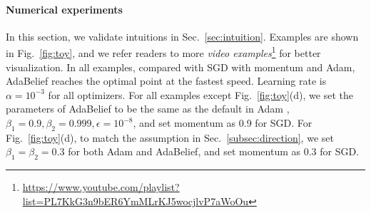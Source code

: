 \documentclass{article}
\begin{document}
\paragraph{Numerical experiments}
In this section, we validate intuitions in Sec.~\ref{sec:intuition}. Examples are shown in Fig.~\ref{fig:toy}, and we refer readers to more \textit{video examples}\footnote{\url{https://www.youtube.com/playlist?list=PL7KkG3n9bER6YmMLrKJ5wocjlvP7aWoOu}} for better visualization. In all examples, compared with SGD with momentum and Adam, AdaBelief reaches the optimal point at the fastest speed. Learning rate is $\alpha=10^{-3}$ for all optimizers. For all examples except Fig.~\ref{fig:toy}(d), we set the parameters of AdaBelief to be the same as the default in Adam \cite{kingma2014adam}, $\beta_1 = 0.9, \beta_2=0.999, \epsilon = 10^{-8}$, and set momentum as 0.9 for SGD. For Fig.~\ref{fig:toy}(d), to match the assumption in Sec.~\ref{subsec:direction}, we set $\beta_1 = \beta_2 = 0.3$ for both Adam and AdaBelief, and set momentum as $0.3$ for SGD. 
\end{document}
